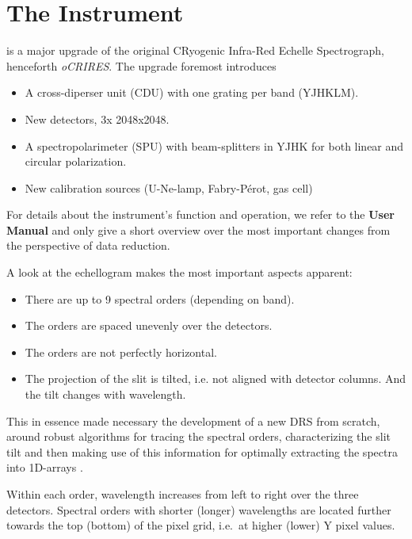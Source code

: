 \section{The Instrument}
\label{sec:instrument}

\instrument{} is a major upgrade of the original CRyogenic Infra-Red Echelle
Spectrograph, henceforth \textit{oCRIRES}. The upgrade foremost introduces
\begin{itemize}
  \item A cross-diperser unit (CDU) with one grating per band (YJHKLM).
  \item New detectors, 3x 2048x2048.
  \item A spectropolarimeter (SPU) with beam-splitters in YJHK for both linear
        and circular polarization.
  \item New calibration sources (U-Ne-lamp, Fabry-Pérot, gas cell)
\end{itemize}

For details about the instrument's function and operation, we refer to the
\textbf{User Manual} \cite{CIRESMAN} and only give a short overview over the
most important changes from the perspective of data reduction.

A look at the echellogram makes the most important aspects apparent:

\begin{itemize}
  \item There are up to 9 spectral orders (depending on band).
  \item The orders are spaced unevenly over the detectors.
  \item The orders are not perfectly horizontal.
  \item The projection of the slit is tilted, i.e. not aligned with detector
    columns. And the tilt changes with wavelength.
\end{itemize}

This in essence made necessary the development of a new DRS from scratch, around
robust algorithms for tracing the spectral orders, characterizing the slit tilt
and then making use of this information for optimally extracting the spectra
into 1D-arrays \cite{2021A&A...646A..32P}.

Within each order, wavelength increases from left to right over the three
detectors. Spectral orders with shorter (longer) wavelengths are located further
towards the top (bottom) of the pixel grid, i.e.~at higher (lower) Y pixel
values.

